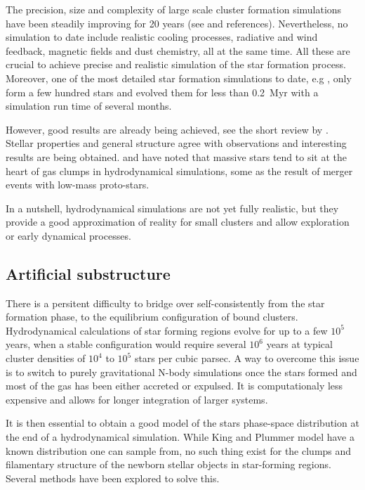 The precision, size and complexity of large scale cluster formation simulations have been steadily improving for 20 years (see \citealt{Turner1995,Klessen2000,Bate2003,Offner2009,Myers2014} and references). Nevertheless, no simulation to date include realistic cooling processes, radiative and wind feedback, magnetic fields and dust chemistry, all at the same time. All these are crucial to achieve precise and realistic simulation of the star formation process. Moreover, one of the most detailed star formation simulations to date, e.g \cite{Bate2012}, only form a few hundred stars and evolved them for less than 0.2~Myr with a simulation run time of several months.

However, good results are already being achieved, see the short review by \cite{Clarke2012}. Stellar properties and general structure agree with observations and interesting results are being obtained. \cite{Maschberger2011} and \cite{Moeckel2011} have noted that massive stars tend to sit at the heart of gas clumps in hydrodynamical simulations, some as the result of merger events with low-mass proto-stars. 

In a nutshell, hydrodynamical simulations are not yet fully realistic, but they provide a good approximation of reality for small clusters and allow exploration or early dynamical processes.


\subsection{Artificial substructure}

There is a persitent difficulty to bridge over self-consistently from the star formation phase, to the equilibrium configuration of bound clusters. Hydrodynamical calculations of star forming regions evolve for  up to a few $10^5$ years, when a stable configuration would require several $10^6$ years at typical cluster densities of $10^4$ to $10^5$ stars per cubic parsec. A way to overcome this issue is to switch to purely gravitational N-body simulations once the stars formed and most of the gas has been either accreted or expulsed. It is computationaly less expensive and allows for longer integration of larger systems.

It is then essential to obtain a good model of the stars phase-space distribution at the end of a hydrodynamical simulation. While King and Plummer model have a known distribution one can sample from, no such thing exist for the clumps and filamentary structure of the newborn stellar objects in star-forming regions. Several methods have been explored to solve this.



